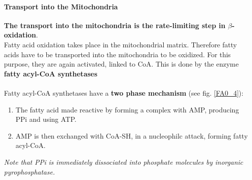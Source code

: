 \documentclass[../main.tex]{subfiles}
\begin{document}
\paragraph{Transport into the Mitochondria}
\textbf{The transport into the mitochondria is the rate-limiting step in $\beta$-oxidation}.\\
Fatty acid oxidation takes place in the mitochondrial matrix. Therefore fatty acids have to be transported into the mitochondria to be oxidized. For this purpose, they are again activated, linked to CoA. This is done by the enzyme \textbf{fatty acyl-CoA synthetases}\\
\\
Fatty acyl-CoA synthetases have a \textbf{two phase mechanism} (see fig. \ref{FA0_4}): 
\begin{enumerate}
	\item The fatty acid made reactive by forming a complex with AMP, producing PPi and using ATP. 
	\item AMP is then exchanged with CoA-SH, in a nucleophilc attack, forming fatty acyl-CoA. 
\end{enumerate}
\noindent \textit{Note that PPi is immediately dissociated into phosphate molecules by inorganic pyrophosphatase. } 
\end{document}
